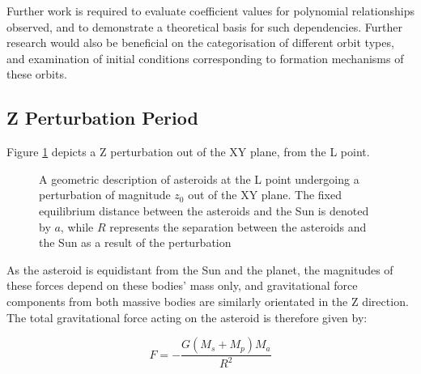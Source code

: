 \documentclass[11pt, a4paper,twocolumn]{article} %
\begin{document}
Further work is required to evaluate coefficient values for polynomial relationships observed, and to demonstrate a theoretical basis for such dependencies.
Further research would also be beneficial on the categorisation of different orbit types, and examination of initial conditions corresponding to formation mechanisms of these orbits. 



\clearpage
\printbibliography

\onecolumn
\begin{appendices}
\section{Z Perturbation Period} \label{zperiod}
Figure \ref{fig:geometryz} depicts a Z perturbation out of the XY plane, from the L point.
\begin{figure} [h]
	\centering
	\caption{A geometric description of asteroids at the L point undergoing a perturbation of magnitude $z_{0}$ out of the XY plane. The fixed equilibrium distance between the asteroids and the Sun is denoted by $a$, while $R$ represents the separation between the asteroids and the Sun as a result of the perturbation} 
	\label{fig:geometryz}
\end{figure}

As the asteroid is equidistant from the Sun and the planet, the magnitudes of these forces depend on these bodies' mass only, and gravitational force components from both massive bodies are similarly orientated in the Z direction. The total gravitational force acting on the asteroid is therefore given by:

\begin{equation}
F = - \frac{G (M_{s} + M_{p}) M_{a}}{R^{2}}
\end{equation}
	

\end{appendices}
\end{document}
